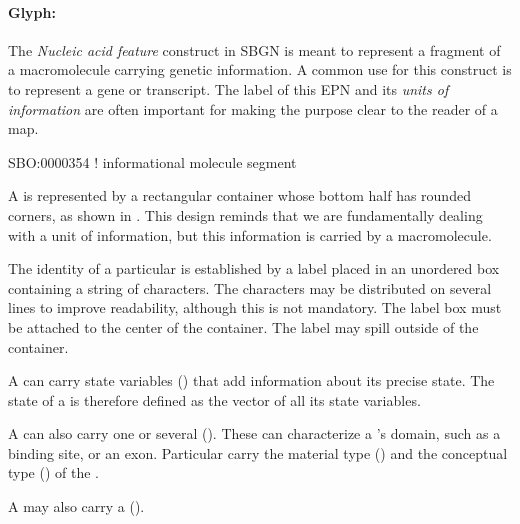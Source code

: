 
\paragraph{Glyph: }
\label{sec:genetic}

The \emph{Nucleic acid feature} construct in SBGN is meant to represent a fragment of a macromolecule carrying genetic information.  A common use for this construct is to represent a gene or transcript.  The label of this EPN and its \emph{units of information} are often important for making the purpose clear to the reader of a map.

\begin{glyphDescription}

\glyphSboTerm SBO:0000354 !  informational molecule segment

\glyphContainer A  is represented by a rectangular container whose bottom half has rounded corners, as shown in . This design reminds that we are fundamentally dealing with a unit of information, but this information is carried by a macromolecule.

\glyphLabel The identity of a particular  is established by a label placed in an unordered box containing a string of characters.  The characters may be distributed on several lines to improve readability, although this is not mandatory.  The label box must be attached to the center of the container.  The label may spill outside of the container.

\glyphAux A  can carry state variables () that add information about its precise state.  The state of a  is therefore defined as the vector of all its state variables. 

A  can also carry one or several  ().  These can characterize a 's domain, such as a binding site, or an exon.  Particular  carry the material type () and the conceptual type () of the . 

A  may also carry a 
().

\end{glyphDescription}


